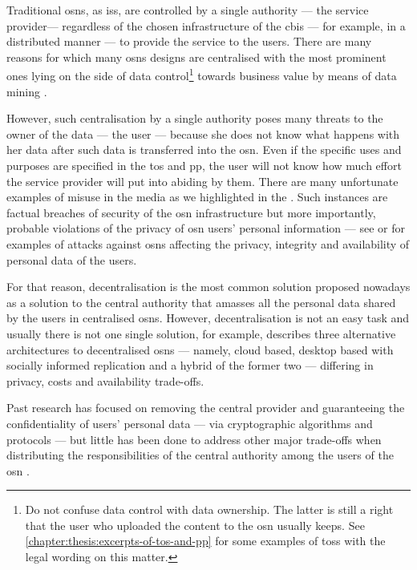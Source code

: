 Traditional \acp{osn}, as \acp{is}, are controlled by a single authority --- the 
service provider--- regardless of the chosen infrastructure of the \ac{cbis} --- 
for example, in a distributed manner --- to provide the service to the users. There 
are many reasons for which many \acp{osn} designs are centralised with the most 
prominent ones lying on the side of data control\footnote{Do not confuse data control 
with data ownership. The latter is still a right that the user who uploaded the content 
to the \ac{osn} usually keeps. See \cref{chapter:thesis:excerpts-of-tos-and-pp} for some 
examples of \acp{tos} with the legal wording on this matter.} towards business value 
by means of data mining \cite{DomingosR01}.

However, such centralisation by a single authority poses many threats to the owner 
of the data --- the user --- because she does not know what happens with her data 
after such data is transferred into the \ac{osn}. Even if the specific uses and 
purposes are specified in the \ac{tos} and \ac{pp}, the user will not know how much 
effort the service provider will put into abiding by them. There are many unfortunate 
examples of misuse in the media as we highlighted in the .
Such instances are factual breaches of security of the \ac{osn} infrastructure but 
more importantly, probable violations of the privacy of \ac{osn} users' personal 
information --- see \cite{CutilloMS10} or \cite{GaoHHWC11} for examples of attacks 
against \acp{osn} affecting the privacy, integrity and availability of personal 
data of the users.

For that reason, decentralisation is the most common solution proposed nowadays 
as a solution to the central authority that amasses all the personal data shared 
by the users in centralised \acp{osn}. However, decentralisation is not an easy 
task and usually there is not one single solution, for example, \cite{ShakimovVCC09} 
describes three alternative architectures to decentralised \acp{osn} --- namely, 
cloud based, desktop based with socially informed replication and a hybrid of the 
former two --- differing in privacy, costs and availability trade-offs. 

Past research has focused on removing the central provider and guaranteeing the 
confidentiality of users' personal data --- via cryptographic algorithms and protocols 
--- but little has been done to address other major trade-offs when distributing 
the responsibilities of the central authority among the users of the \ac{osn} \cite{GreschbachKB12}
.%

